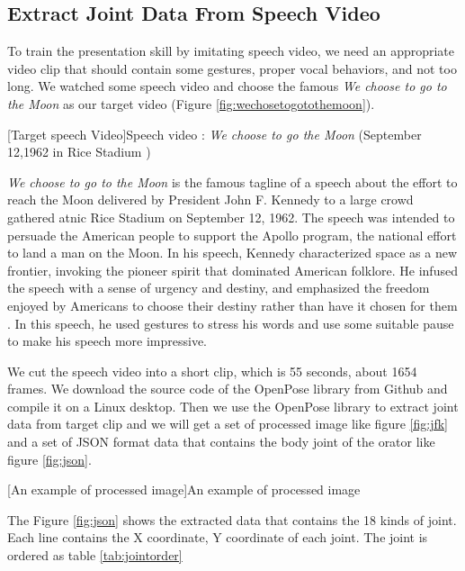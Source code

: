 \subsection*{Extract Joint Data From Speech Video}

\par To train the presentation skill by imitating speech video, we need an appropriate video clip that should contain some gestures, proper vocal behaviors, and not too long. We watched some speech video and choose the famous \textit{We choose to go to the Moon} as our target video (Figure \ref{fig:wechosetogotothemoon}).


[Target speech Video]{Speech video : \textit{We choose to go the Moon} (September 12,1962 in Rice Stadium )}

\par \textit{We choose to go to the Moon} is the famous tagline of a speech about the effort to reach the Moon delivered by President John F. Kennedy to a large crowd gathered atnic Rice Stadium on September 12, 1962. The speech was intended to persuade the American people to support the Apollo program, the national effort to land a man on the Moon. In his speech, Kennedy characterized space as a new frontier, invoking the pioneer spirit that dominated American folklore. He infused the speech with a sense of urgency and destiny, and emphasized the freedom enjoyed by Americans to choose their destiny rather than have it chosen for them \cite{Affairs}. In this speech, he used gestures to stress his words and use some suitable pause to make his speech more impressive.

\par We cut the speech video into a short clip, which is 55 seconds, about 1654 frames. We download the source code of the OpenPose library from Github and compile it on a Linux desktop. Then we use the OpenPose library to extract joint data from target clip and we will get a set of processed image like figure \ref{fig:jfk}  and a set of JSON format data that contains the body joint of the orator like figure \ref{fig:json}.

[An example of processed image]{An example of processed image}

\par The Figure \ref{fig:json} shows the extracted data that contains the 18 kinds of joint. Each line contains the X coordinate, Y coordinate of each joint. The joint is ordered as table \ref{tab:jointorder}

